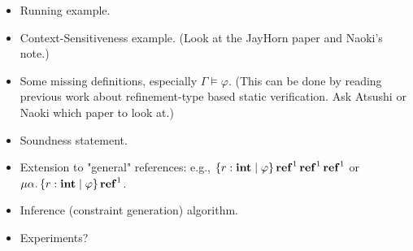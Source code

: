 \documentclass[runningheads]{llncs}
\begin{document}
\begin{itemize}
\item Running example.
\item Context-Sensitiveness example. (Look at the JayHorn paper and Naoki's note.)
\item Some missing definitions, especially $\Gamma \models \varphi$.  (This can be done by reading previous work about refinement-type based static verification.  Ask Atsushi or Naoki which paper to look at.)
\item Soundness statement.
\item Extension to "general" references: e.g., $\left\{{r : \mathbf{int} \mid \varphi}\right\} \operatorname{\mathbf{ref}}^1 \operatorname{\mathbf{ref}}^1 \operatorname{\mathbf{ref}}^1$ or $\mu\alpha. \left\{{r : \mathbf{int} \mid \varphi}\right\} \operatorname{\mathbf{ref}}^1$.
\item Inference (constraint generation) algorithm.
\item Experiments?
\end{itemize}

\newcommand\DOM{\textit{dom}}
\newcommand\EXTEND[1]{\{{#1}\}}
\end{document}
